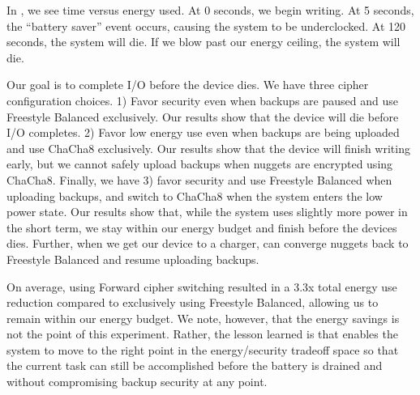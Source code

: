 In , we see time versus energy used. At 0 seconds, we
begin writing. At 5 seconds, the ``battery saver'' event occurs, causing the
system to be underclocked. At 120 seconds, the system will die. If we blow past
our energy ceiling, the system will die.

Our goal is to complete I/O before the device dies. We have three cipher
configuration choices. 1) Favor security even when backups are paused and use
Freestyle Balanced exclusively. Our results show that the device will die before
I/O completes. 2) Favor low energy use even when backups are being uploaded and
use ChaCha8 exclusively. Our results show that the device will finish writing
early, but we cannot safely upload backups when nuggets are encrypted using
ChaCha8. Finally, we have 3) favor security and use Freestyle Balanced when
uploading backups, and switch to ChaCha8 when the system enters the low power
state. Our results show that, while the system uses slightly more power in the
short term, we stay within our energy budget and finish before the devices dies.
Further, when we get our device to a charger, \sys can converge nuggets
back to Freestyle Balanced and resume uploading backups.

On average, using Forward cipher switching resulted in a 3.3x total
energy use reduction compared to exclusively using Freestyle Balanced,
allowing us to remain within our energy budget. We note, however, that
the energy savings is not the point of this experiment. Rather, the
lesson learned is that \sys enables the system to move to the
right point in the energy/security tradeoff space so that the current
task can still be accomplished before the battery is drained and
without compromising backup security at any point.  

